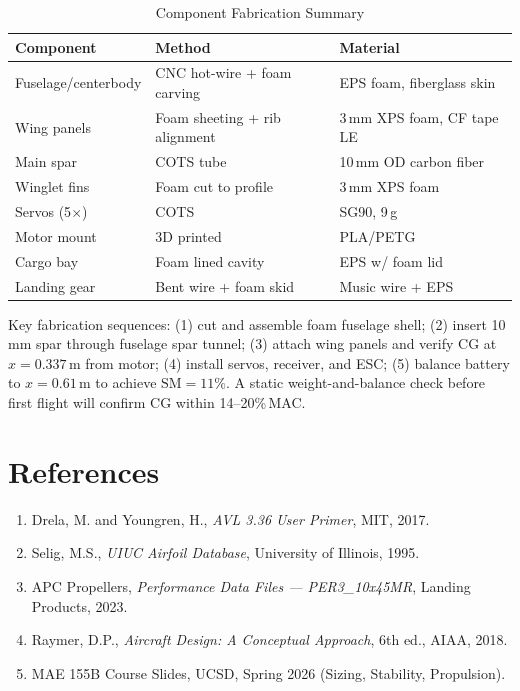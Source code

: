 \documentclass[10pt]{article}
\begin{document}
\begin{table}[H]
\centering
\caption{Component Fabrication Summary}
\small
\begin{tabular}{lll}
\toprule
Component & Method & Material \\
\midrule
Fuselage/centerbody & CNC hot-wire + foam carving & EPS foam, fiberglass skin \\
Wing panels & Foam sheeting + rib alignment & 3\,mm XPS foam, CF tape LE \\
Main spar & COTS tube & 10\,mm OD carbon fiber \\
Winglet fins & Foam cut to profile & 3\,mm XPS foam \\
Servos (5$\times$) & COTS & SG90, 9\,g \\
Motor mount & 3D printed & PLA/PETG \\
Cargo bay & Foam lined cavity & EPS w/ foam lid \\
Landing gear & Bent wire + foam skid & Music wire + EPS \\
\bottomrule
\end{tabular}
\end{table}

Key fabrication sequences: (1) cut and assemble foam fuselage shell;
(2) insert 10\,mm spar through fuselage spar tunnel;
(3) attach wing panels and verify CG at $x = 0.337$\,m from motor;
(4) install servos, receiver, and ESC;
(5) balance battery to $x = 0.61$\,m to achieve $\text{SM} = 11\%$.
A static weight-and-balance check before first flight will confirm CG
within 14--20\%\,MAC.

\section*{References}

\begin{enumerate}\itemsep0pt
  \item Drela, M. and Youngren, H., \textit{AVL 3.36 User Primer}, MIT, 2017.
  \item Selig, M.S., \textit{UIUC Airfoil Database}, University of Illinois, 1995.
  \item APC Propellers, \textit{Performance Data Files --- PER3\_10x45MR}, Landing Products, 2023.
  \item Raymer, D.P., \textit{Aircraft Design: A Conceptual Approach}, 6th ed., AIAA, 2018.
  \item MAE 155B Course Slides, UCSD, Spring 2026 (Sizing, Stability, Propulsion).
\end{enumerate}
\end{document}
